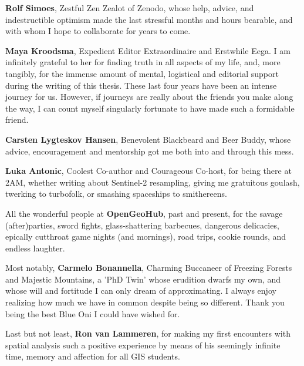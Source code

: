 \textbf{Rolf Simoes}, Zestful Zen Zealot of Zenodo, whose help, advice, and indestructible optimism made the last stressful months and hours bearable, and with whom I hope to collaborate for years to come.

\textbf{Maya Kroodsma}, Expedient Editor Extraordinaire and Erstwhile Eega. I am infinitely grateful to her for finding truth in all aspects of my life, and, more tangibly, for the immense amount of mental, logistical and editorial support during the writing of this thesis. These last four years have been an intense journey for us. However, if journeys are really about the friends you make along the way, I can count myself singularly fortunate to have made such a formidable friend.

\textbf{Carsten Lygteskov Hansen}, Benevolent Blackbeard and Beer Buddy, whose advice, encouragement and mentorship got me both into and through this mess.

\textbf{Luka Antonic}, Coolest Co-author and Courageous Co-host, for being there at 2AM, whether writing about Sentinel-2 resampling, giving me gratuitous goulash, twerking to turbofolk, or smashing spaceships to smithereens.

All the wonderful people at \textbf{OpenGeoHub}, past and present, for the savage (after)parties, sword fights, glass-shattering barbecues, dangerous delicacies, epically cutthroat game nights (and mornings), road trips, cookie rounds, and endless laughter.

Most notably, \textbf{Carmelo Bonannella}, Charming Buccaneer of Freezing Forests and Majestic Mountains, a 'PhD Twin' whose erudition dwarfs my own, and whose will and fortitude I can only dream of approximating. I always enjoy realizing how much we have in common despite being so different. Thank you being the best Blue Oni I could have wished for.

Last but not least, \textbf{Ron van Lammeren}, for making my first encounters with spatial analysis such a positive experience by means of his seemingly infinite time, memory and affection for all GIS students. 